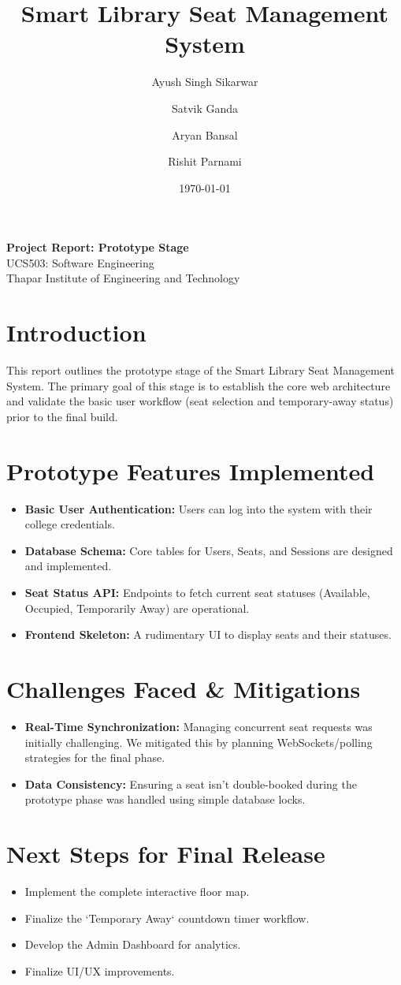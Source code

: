 \documentclass[11pt,a4paper]{article}
\title{Smart Library Seat Management System}
\author{
  Ayush Singh Sikarwar \and Satvik Ganda \and Aryan Bansal \and Rishit Parnami
}
\date{\today}
\begin{document}
\maketitle
\begin{center}
\large \textbf{Project Report: Prototype Stage} \\
\vspace{0.5cm}
UCS503: Software Engineering \\
Thapar Institute of Engineering and Technology
\end{center}

\section{Introduction}
This report outlines the prototype stage of the Smart Library Seat Management System. The primary goal of this stage is to establish the core web architecture and validate the basic user workflow (seat selection and temporary-away status) prior to the final build.

\section{Prototype Features Implemented}
\begin{itemize}
    \item \textbf{Basic User Authentication:} Users can log into the system with their college credentials.
    \item \textbf{Database Schema:} Core tables for Users, Seats, and Sessions are designed and implemented.
    \item \textbf{Seat Status API:} Endpoints to fetch current seat statuses (Available, Occupied, Temporarily Away) are operational.
    \item \textbf{Frontend Skeleton:} A rudimentary UI to display seats and their statuses.
\end{itemize}

\section{Challenges Faced \& Mitigations}
\begin{itemize}
    \item \textbf{Real-Time Synchronization:} Managing concurrent seat requests was initially challenging. We mitigated this by planning WebSockets/polling strategies for the final phase.
    \item \textbf{Data Consistency:} Ensuring a seat isn't double-booked during the prototype phase was handled using simple database locks.
\end{itemize}

\section{Next Steps for Final Release}
\begin{itemize}
    \item Implement the complete interactive floor map.
    \item Finalize the `Temporary Away` countdown timer workflow.
    \item Develop the Admin Dashboard for analytics.
    \item Finalize UI/UX improvements.
\end{itemize}
\end{document}
